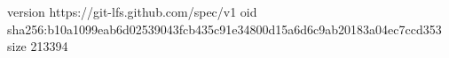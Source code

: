 version https://git-lfs.github.com/spec/v1
oid sha256:b10a1099eab6d02539043fcb435c91e34800d15a6d6c9ab20183a04ec7ccd353
size 213394
